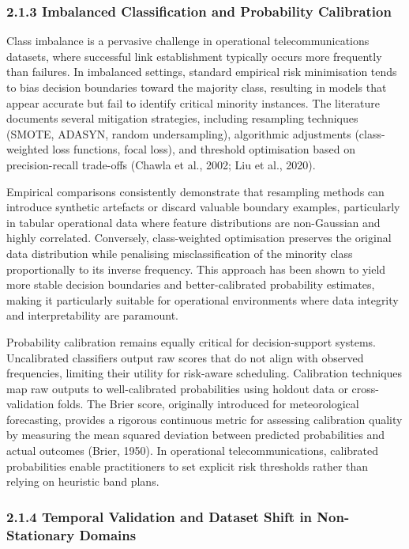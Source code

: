 \subsubsection{2.1.3 Imbalanced Classification and Probability
Calibration}\label{imbalanced-classification-and-probability-calibration}

Class imbalance is a pervasive challenge in operational
telecommunications datasets, where successful link establishment
typically occurs more frequently than failures. In imbalanced settings,
standard empirical risk minimisation tends to bias decision boundaries
toward the majority class, resulting in models that appear accurate but
fail to identify critical minority instances. The literature documents
several mitigation strategies, including resampling techniques (SMOTE,
ADASYN, random undersampling), algorithmic adjustments (class-weighted
loss functions, focal loss), and threshold optimisation based on
precision-recall trade-offs (Chawla et al., 2002; Liu et al., 2020).

Empirical comparisons consistently demonstrate that resampling methods
can introduce synthetic artefacts or discard valuable boundary examples,
particularly in tabular operational data where feature distributions are
non-Gaussian and highly correlated. Conversely, class-weighted
optimisation preserves the original data distribution while penalising
misclassification of the minority class proportionally to its inverse
frequency. This approach has been shown to yield more stable decision
boundaries and better-calibrated probability estimates, making it
particularly suitable for operational environments where data integrity
and interpretability are paramount.

Probability calibration remains equally critical for decision-support
systems. Uncalibrated classifiers output raw scores that do not align
with observed frequencies, limiting their utility for risk-aware
scheduling. Calibration techniques map raw outputs to well-calibrated
probabilities using holdout data or cross-validation folds. The Brier
score, originally introduced for meteorological forecasting, provides a
rigorous continuous metric for assessing calibration quality by
measuring the mean squared deviation between predicted probabilities and
actual outcomes (Brier, 1950). In operational telecommunications,
calibrated probabilities enable practitioners to set explicit risk
thresholds rather than relying on heuristic band plans.

\subsubsection{2.1.4 Temporal Validation and Dataset Shift in
Non-Stationary
Domains}\label{temporal-validation-and-dataset-shift-in-non-stationary-domains}

